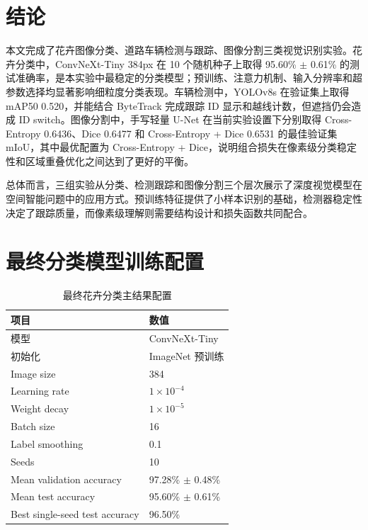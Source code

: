 \documentclass[UTF8,a4paper,11pt]{ctexart}
\newcommand{\accpm}[2]{#1\% $\pm$ #2\%}
\begin{document}
\section{结论}

本文完成了花卉图像分类、道路车辆检测与跟踪、图像分割三类视觉识别实验。花卉分类中，ConvNeXt-Tiny 384px 在 10 个随机种子上取得 \accpm{95.60}{0.61} 的测试准确率，是本实验中最稳定的分类模型；预训练、注意力机制、输入分辨率和超参数选择均显著影响细粒度分类表现。车辆检测中，YOLOv8s 在验证集上取得 mAP50 0.520，并能结合 ByteTrack 完成跟踪 ID 显示和越线计数，但遮挡仍会造成 ID switch。图像分割中，手写轻量 U-Net 在当前实验设置下分别取得 Cross-Entropy 0.6436、Dice 0.6477 和 Cross-Entropy + Dice 0.6531 的最佳验证集 mIoU，其中最优配置为 Cross-Entropy + Dice，说明组合损失在像素级分类稳定性和区域重叠优化之间达到了更好的平衡。

总体而言，三组实验从分类、检测跟踪和图像分割三个层次展示了深度视觉模型在空间智能问题中的应用方式。预训练特征提供了小样本识别的基础，检测器稳定性决定了跟踪质量，而像素级理解则需要结构设计和损失函数共同配合。

\appendix

\section{最终分类模型训练配置}
\label{app:classification-final-config}

\begin{table}[H]
    \centering
    \caption{最终花卉分类主结果配置}
    \small
    \begin{tabular}{ll}
        \toprule
        项目 & 数值 \\
        \midrule
        模型 & ConvNeXt-Tiny \\
        初始化 & ImageNet 预训练 \\
        Image size & 384 \\
        Learning rate & \(1\times10^{-4}\) \\
        Weight decay & \(1\times10^{-5}\) \\
        Batch size & 16 \\
        Label smoothing & 0.1 \\
        Seeds & 10 \\
        Mean validation accuracy & \accpm{97.28}{0.48} \\
        Mean test accuracy & \accpm{95.60}{0.61} \\
        Best single-seed test accuracy & 96.50\% \\
        \bottomrule
    \end{tabular}
\end{table}
\end{document}
